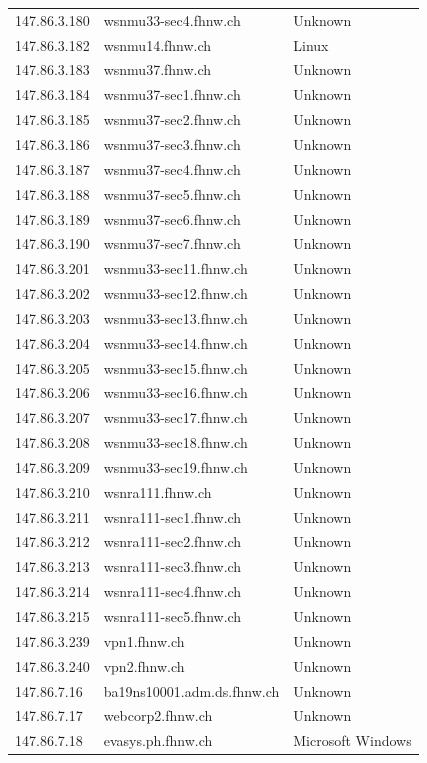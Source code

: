 \documentclass[11pt,a4paper]{scrartcl}
\begin{document}
\begin{longtable}{p{2.5cm}|p{8cm}|l}
	147.86.3.180 & wsnmu33-sec4.fhnw.ch & Unknown\\
	147.86.3.182 & wsnmu14.fhnw.ch & Linux\\
	147.86.3.183 & wsnmu37.fhnw.ch & Unknown\\
	147.86.3.184 & wsnmu37-sec1.fhnw.ch & Unknown\\
	147.86.3.185 & wsnmu37-sec2.fhnw.ch & Unknown\\
	147.86.3.186 & wsnmu37-sec3.fhnw.ch & Unknown\\
	147.86.3.187 & wsnmu37-sec4.fhnw.ch & Unknown\\
	147.86.3.188 & wsnmu37-sec5.fhnw.ch & Unknown\\
	147.86.3.189 & wsnmu37-sec6.fhnw.ch & Unknown\\
	147.86.3.190 & wsnmu37-sec7.fhnw.ch & Unknown\\
	147.86.3.201 & wsnmu33-sec11.fhnw.ch & Unknown\\
	147.86.3.202 & wsnmu33-sec12.fhnw.ch & Unknown\\
	147.86.3.203 & wsnmu33-sec13.fhnw.ch & Unknown\\
	147.86.3.204 & wsnmu33-sec14.fhnw.ch & Unknown\\
	147.86.3.205 & wsnmu33-sec15.fhnw.ch & Unknown\\
	147.86.3.206 & wsnmu33-sec16.fhnw.ch & Unknown\\
	147.86.3.207 & wsnmu33-sec17.fhnw.ch & Unknown\\
	147.86.3.208 & wsnmu33-sec18.fhnw.ch & Unknown\\
	147.86.3.209 & wsnmu33-sec19.fhnw.ch & Unknown\\
	147.86.3.210 & wsnra111.fhnw.ch & Unknown\\
	147.86.3.211 & wsnra111-sec1.fhnw.ch & Unknown\\
	147.86.3.212 & wsnra111-sec2.fhnw.ch & Unknown\\
	147.86.3.213 & wsnra111-sec3.fhnw.ch & Unknown\\
	147.86.3.214 & wsnra111-sec4.fhnw.ch & Unknown\\
	147.86.3.215 & wsnra111-sec5.fhnw.ch & Unknown\\
	147.86.3.239 & vpn1.fhnw.ch & Unknown\\
	147.86.3.240 & vpn2.fhnw.ch & Unknown\\
	147.86.7.16 & ba19ns10001.adm.ds.fhnw.ch & Unknown\\
	147.86.7.17 & webcorp2.fhnw.ch & Unknown\\
	147.86.7.18 & evasys.ph.fhnw.ch & Microsoft Windows\\

\end{longtable}
\end{document}
